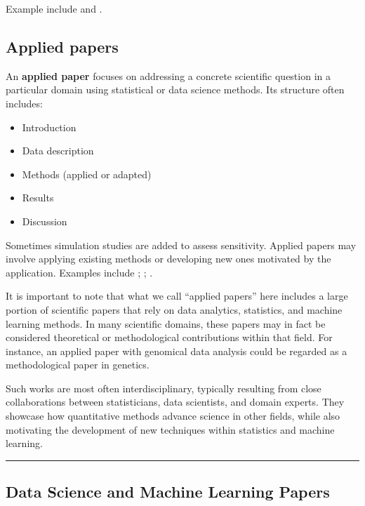 \documentclass[
]{book}
\providecommand{\tightlist}{%
  \setlength{\itemsep}{0pt}\setlength{\parskip}{0pt}}
\theoremstyle{definition}
\theoremstyle{definition}
\theoremstyle{definition}
\theoremstyle{definition}
\theoremstyle{remark}
\begin{document}
Example include \citet{li2023regularized} and \citet{lau2022bias}.

\subsection{Applied papers}\label{applied-papers}

An \textbf{applied paper} focuses on addressing a concrete scientific question in a particular domain using statistical or data science methods. Its structure often includes:

\begin{itemize}
\tightlist
\item
  Introduction\\
\item
  Data description\\
\item
  Methods (applied or adapted)\\
\item
  Results\\
\item
  Discussion
\end{itemize}

Sometimes simulation studies are added to assess sensitivity. Applied papers may involve applying existing methods or developing new ones motivated by the application. Examples include \citet{price2022effects}; \citet{caplan2019dental}; \citet{jiao2022cyberattack}.

It is important to note that what we call ``applied papers'' here includes a large portion of scientific papers that rely on data analytics, statistics, and machine learning methods. In many scientific domains, these papers may in fact be considered theoretical or methodological contributions within that field. For instance, an applied paper with genomical data analysis could be regarded as a methodological paper in genetics.

Such works are most often interdisciplinary, typically resulting from close collaborations between statisticians, data scientists, and domain experts. They showcase how quantitative methods advance science in other fields, while also motivating the development of new techniques within statistics and machine learning.

\begin{center}\rule{0.5\linewidth}{0.5pt}\end{center}

\subsection{Data Science and Machine Learning Papers}\label{data-science-and-machine-learning-papers}
\end{document}
